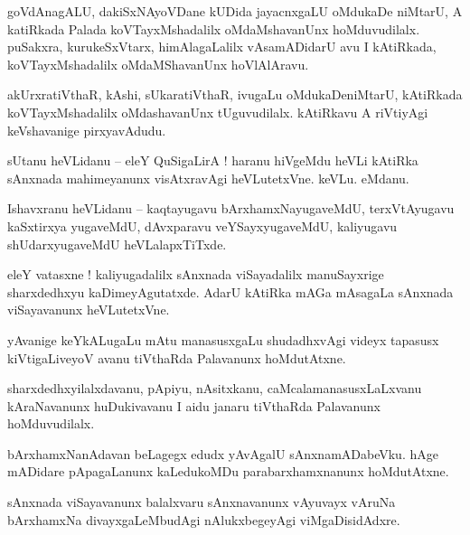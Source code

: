 \documentclass{article}
\begin{document}
\begin{mn}%
goVdAnagALU, dakiSxNAyoVDane kUDida jayacnxgaLU oMdukaDe niMtarU, A katiRkada Palada 
koVTayxMshadalilx oMdaMshavanUnx hoMduvudilalx. puSakxra, kurukeSxVtarx, himAlagaLalilx 
vAsamADidarU avu I kAtiRkada, koVTayxMshadalilx oMdaMShavanUnx hoVlAlAravu.
\end{mn}

\begin{mn}%
akUrxratiVthaR, kAshi, sUkaratiVthaR, ivugaLu oMdukaDeniMtarU, kAtiRkada koVTayxMshadalilx 
oMdashavanUnx tUguvudilalx. kAtiRkavu A riVtiyAgi keVshavanige pirxyavAdudu.
\end{mn}

\begin{mn}%
sUtanu heVLidanu -- eleY QuSigaLirA ! haranu hiVgeMdu heVLi kAtiRka sAnxnada mahimeyanunx 
visAtxravAgi heVLutetxVne. keVLu. eMdanu.
\end{mn}

\begin{mn}%
Ishavxranu heVLidanu -- kaqtayugavu bArxhamxNayugaveMdU, terxVtAyugavu kaSxtirxya yugaveMdU, 
dAvxparavu veYSayxyugaveMdU, kaliyugavu shUdarxyugaveMdU heVLalapxTiTxde.
\end{mn}

\begin{mn}%
eleY vatasxne ! kaliyugadalilx sAnxnada viSayadalilx manuSayxrige sharxdedhxyu kaDimeyAgutatxde. 
AdarU kAtiRka mAGa mAsagaLa sAnxnada viSayavanunx heVLutetxVne.
\end{mn}

\begin{mn}%
yAvanige keYkALugaLu mAtu manasusxgaLu shudadhxvAgi videyx tapasusx kiVtigaLiveyoV avanu tiVthaRda 
Palavanunx hoMdutAtxne.
\end{mn}

\begin{mn}%
sharxdedhxyilalxdavanu, pApiyu, nAsitxkanu, caMcalamanasusxLaLxvanu kAraNavanunx huDukivavanu I 
aidu janaru tiVthaRda Palavanunx hoMduvudilalx.
\end{mn}

\begin{mn}%
bArxhamxNanAdavan beLagegx edudx yAvAgalU sAnxnamADabeVku. hAge mADidare pApagaLanunx kaLedukoMDu 
parabarxhamxnanunx hoMdutAtxne.
\end{mn}

\begin{mn}%
sAnxnada viSayavanunx balalxvaru sAnxnavanunx vAyuvayx vAruNa bArxhamxNa divayxgaLeMbudAgi 
nAlukxbegeyAgi viMgaDisidAdxre.
\end{mn}
\end{document}
